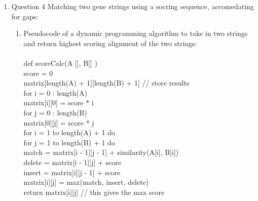 \documentclass{article}
\newcommand\tab[1][1cm]{\hspace*{#1}}
\begin{document}
\begin{enumerate}
  \item Question 4 Matching two gene strings using a socring sequence, accomedating for gaps:
    \begin{enumerate}
      \item Pseudocode of a dynamic programming algorithm to take in two strings and return highest
        scoring alignment of the two strings:\\\\
        def scoreCalc(A [], B[] )\\
        \tab score = 0\\
        \tab matrix[length(A) + 1][length(B) + 1] // store results\\
        \tab for i = 0 : length(A)\\
        \tab \tab matrix[i][0] = score * i\\
        \tab for j = 0 : length(B)\\
        \tab \tab matrix[0][j] = score * j\\
        \tab for i = 1 to length(A) + 1 do\\
        \tab \tab for j = 1 to length(B) + 1 do\\
        \tab \tab \tab match = matrix[i - 1][j - 1] + similarity(A[i], B[i])\\
        \tab \tab \tab delete = matrix[i - 1][j] + score\\
        \tab \tab \tab insert = matrix[i][j - 1] + score\\
        \tab \tab \tab matrix[i][j] = max(match, insert, delete)\\
        \tab return matrix[i][j] // this gives the max score \\\\


\end{enumerate}
\end{enumerate}
\end{document}
